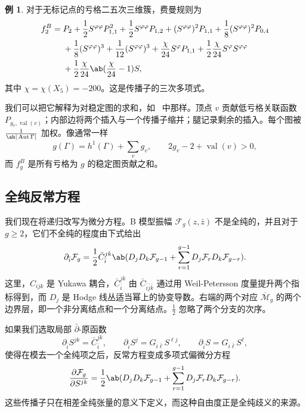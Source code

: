\documentclass{amsart}
\theoremstyle{definition}
\newtheorem{exm}[thm]{例}
\theoremstyle{remark}
\theoremstyle{plain}
\theoremstyle{definition}
\theoremstyle{remark}
\newcommand{\Mbar}{\overline{\mathcal{M}}}
\newcommand{\mc}[1]{\mathcal{#1}}
\newcommand{\on}[1]{\operatorname{#1}}
\newcommand{\1}{\mathbf{1}}
\newcommand{\2}{\mathbf{2}}
\newcommand{\3}{\mathbf{3}}
\DeclareMathOperator{\Aut}{Aut}
\begin{document}
\begin{exm}
    对于无标记点的亏格二五次三维簇，费曼规则为
    \begin{align*}
        f_2^B ={}& P_2 + \frac{1}{2}S^{\varphi\varphi}P_{1,1}^2 + \frac{1}{2}S^{\varphi\varphi}P_{1,2} + (S^{\varphi\varphi})^2 P_{1,1} + \frac{1}{8}(S^{\varphi\varphi})^2 P_{0,4} \\
        &+ \frac{1}{8}(S^{\varphi\varphi})^3 + \frac{1}{12}(S^{\varphi\varphi})^3 + \frac{\chi}{24}S^{\varphi}P_{1,1} + \frac{1}{2}\frac{\chi}{24}S^{\varphi}S^{\varphi\varphi} \\
        &+ \frac{1}{2}\frac{\chi}{24}\ab(\frac{\chi}{24}-1)S,
    \end{align*}
    其中 \(\chi = \chi(X_5) = -200\)。这是传播子的三次多项式。
\end{exm}

我们可以把它解释为对稳定图的求和，如~ 中那样。顶点 \(v\) 贡献低亏格关联函数 \(P_{g_v, \on{val}(v)}\)；内部边将两个插入与一个传播子缩并；腿记录剩余的插入。每个图被 \(\frac{1}{\ab|\Aut \Gamma|}\) 加权。像通常一样
\[ g(\Gamma) = h^1(\Gamma) + \sum_v g_v, \qquad 2g_v - 2 + \on{val}(v) > 0, \]
而 \(f_g^B\) 是所有亏格为 \(g\) 的稳定图贡献之和。

\subsection{全纯反常方程}%
\label{sub:The holomorphic anomaly equation}

我们现在将递归改写为微分方程。B 模型振幅 \(\mc{F}_g(z,\bar{z})\) 不是全纯的，并且对于 \(g \geq 2\)，它们不全纯的程度由下式给出
\[ \partial_{\bar{i}} \mc{F}_g = \frac{1}{2}\bar{C}_{\bar{i}}^{jk}\ab( D_j D_k \mc{F}_{g-1} + \sum_{r=1}^{g-1} D_j \mc{F}_r D_k \mc{F}_{g-r} ). \]
这里，\(C_{ijk}\) 是 Yukawa 耦合，\(\bar{C}_{\bar{i}}^{jk}\) 由 \(\bar{C}_{\bar{i}\bar{j}\bar{k}}\) 通过用 Weil-Petersson 度量提升两个指标得到，而 \(D_j\) 是 Hodge 线丛适当幂上的协变导数。右端的两个对应 \(\Mbar_g\) 的两个边界层，即一个非分离结点和一个分离结点。\(\frac{1}{2}\) 忽略了两个分支的次序。

如果我们选取局部 \(\bar{\partial}\)-原函数
\[ \partial_{\bar{i}}S^{jk} = \bar{C}_{\bar{i}}^{jk}, \qquad \partial_{\bar{i}}S^j = G_{i\bar{\ell}}S^{\ell j}, \qquad \partial_{\bar{i}}S = G_{i\bar{\ell}}S^{\ell}, \]
使得在模去一个全纯项之后，反常方程变成多项式偏微分方程
\[ \pdv{\mc{F}_g}{S^{jk}} = \frac{1}{2}\ab( D_jD_k \mc{F}_{g-1} + \sum_{r=1}^{g-1} D_j \mc{F}_r D_k \mc{F}_{g-r} ). \]
这些传播子只在相差全纯张量的意义下定义，而这种自由度正是全纯歧义的来源。
\end{document}
